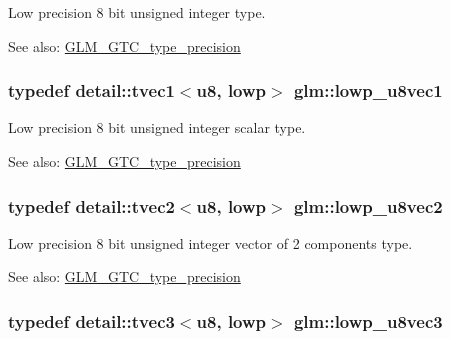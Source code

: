 Low precision 8 bit unsigned integer type. \begin{Desc}
\item[See also:]\hyperlink{group__gtc__type__precision}{GLM\_\-GTC\_\-type\_\-precision} \end{Desc}
\hypertarget{group__gtc__type__precision_gee3cba2c93fa8cb7295671908995197c}{
\subsubsection[lowp\_\-u8vec1]{\setlength{\rightskip}{0pt plus 5cm}typedef detail::tvec1$<$u8, lowp$>$ {\bf glm::lowp\_\-u8vec1}}}
\label{group__gtc__type__precision_gee3cba2c93fa8cb7295671908995197c}


Low precision 8 bit unsigned integer scalar type. \begin{Desc}
\item[See also:]\hyperlink{group__gtc__type__precision}{GLM\_\-GTC\_\-type\_\-precision} \end{Desc}
\hypertarget{group__gtc__type__precision_g8e5a056cbbcb70dca5c65950fa13a787}{
\subsubsection[lowp\_\-u8vec2]{\setlength{\rightskip}{0pt plus 5cm}typedef detail::tvec2$<$u8, lowp$>$ {\bf glm::lowp\_\-u8vec2}}}
\label{group__gtc__type__precision_g8e5a056cbbcb70dca5c65950fa13a787}


Low precision 8 bit unsigned integer vector of 2 components type. \begin{Desc}
\item[See also:]\hyperlink{group__gtc__type__precision}{GLM\_\-GTC\_\-type\_\-precision} \end{Desc}
\hypertarget{group__gtc__type__precision_gf0d7154052c636edf4a902fc8a4a56f2}{
\subsubsection[lowp\_\-u8vec3]{\setlength{\rightskip}{0pt plus 5cm}typedef detail::tvec3$<$u8, lowp$>$ {\bf glm::lowp\_\-u8vec3}}}
\label{group__gtc__type__precision_gf0d7154052c636edf4a902fc8a4a56f2}


